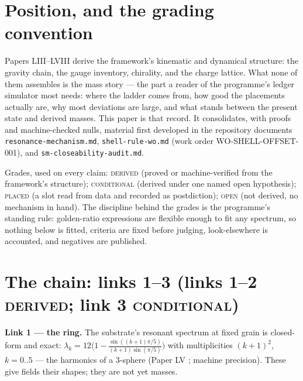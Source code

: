 \documentclass[12pt]{article}
\theoremstyle{definition}
\theoremstyle{remark}
\begin{document}
\begin{abstract}
electron the Coulomb-level values return at the model's own accuracy. Nothing in this paper is fitted; every negative result is published as a constraint.
\end{abstract}

\section{Position, and the grading convention}\label{sec:grades}

Papers LIII--LVIII derive the framework's kinematic and dynamical structure: the gravity chain, the gauge inventory, chirality, and the charge lattice. What none of them assembles is the mass story --- the part a reader of the programme's ledger simulator most needs: where the ladder comes from, how good the placements actually are, why most deviations are large, and what stands between the present state and derived masses. This paper is that record. It consolidates, with proofs and machine-checked nulls, material first developed in the repository documents \texttt{resonance-mechanism.md}, \texttt{shell-rule-wo.md} (work order WO-SHELL-OFFSET-001), and \texttt{sm-closeability-audit.md}.

Grades, used on every claim: \textsc{derived} (proved or machine-verified from the framework's structure); \textsc{conditional} (derived under one named open hypothesis); \textsc{placed} (a slot read from data and recorded as postdiction); \textsc{open} (not derived, no mechanism in hand). The discipline behind the grades is the programme's standing rule: golden-ratio expressions are flexible enough to fit any spectrum, so nothing below is fitted, criteria are fixed before judging, look-elsewhere is accounted, and negatives are published.

\section{The chain: links 1--3 (links 1--2 \textsc{derived}; link 3 \textsc{conditional})}\label{sec:chain}

\textbf{Link 1 --- the ring.} The substrate's resonant spectrum at fixed grain is closed-form and exact: $\lambda_k = 12\bigl(1 - \frac{\sin((k+1)\pi/5)}{(k+1)\sin(\pi/5)}\bigr)$ with multiplicities $(k+1)^2$, $k = 0..5$ --- the harmonics of a 3-sphere (Paper LV \citep{SmartLV}; machine precision). These give fields their shapes; they are not yet masses.
\end{document}
